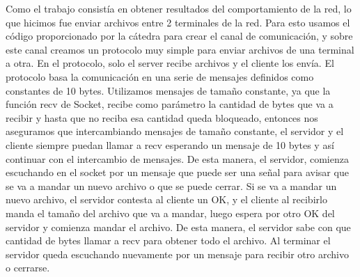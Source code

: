 Como el trabajo consistía en obtener resultados del comportamiento de la red, lo que hicimos fue enviar archivos entre 2 terminales de la red. Para esto usamos el código proporcionado por la cátedra para crear el canal de comunicación, y sobre este canal creamos un protocolo muy simple para enviar archivos de una terminal a otra. En el protocolo, solo el server recibe archivos y el cliente los envía. El protocolo basa la comunicación en una serie de mensajes definidos como constantes de 10 bytes. Utilizamos mensajes de tamaño constante, ya que la función recv de Socket, recibe como parámetro la cantidad de bytes que va a recibir y hasta que no reciba esa cantidad queda bloqueado, entonces nos aseguramos que intercambiando mensajes de tamaño constante, el servidor y el cliente siempre puedan llamar a recv esperando un mensaje de 10 bytes y así continuar con el intercambio de mensajes. De esta manera, el servidor, comienza escuchando en el socket por un mensaje que puede ser una señal para avisar que se va a mandar un nuevo archivo o que se puede cerrar. Si se va a mandar un nuevo archivo, el servidor contesta al cliente un OK, y el cliente al recibirlo manda el tamaño del archivo que va a mandar, luego espera por otro OK del servidor y comienza mandar el archivo. De esta manera, el servidor sabe con que cantidad de bytes llamar a recv para obtener todo el archivo. Al terminar el servidor queda escuchando nuevamente por un mensaje para recibir otro archivo o cerrarse.